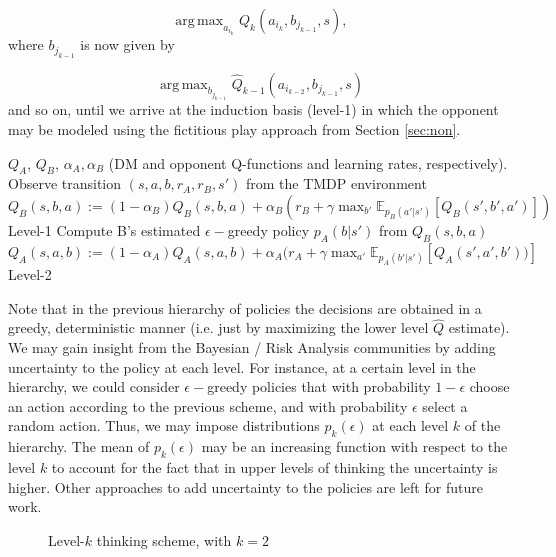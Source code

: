 \documentclass[letterpaper]{article} %
\DeclareMathOperator*{\argmax}{arg\,max}
\begin{document}
\[
\argmax_{a_{i_k}} Q_k(a_{i_k}, b_{j_{k-1}}, s),
\]
where $b_{j_{k-1}}$ is now given by

\[
\argmax_{b_{j_{k-1}}} \hat{Q}_{k-1}(a_{i_{k-2}}, b_{j_{k-1}}, s)
\]
and so on, until we arrive at the induction basis (level-1) in which the opponent may be modeled using the fictitious play approach from Section \ref{sec:non}.

\begin{algorithm*}[!ht]
\begin{algorithmic}
\Require $Q_A$, $Q_B$, $\alpha_A, \alpha_B$ (DM and opponent Q-functions and learning rates, respectively).
\State Observe  transition $(s, a, b, r_A, r_B, s')$ from the TMDP environment
\State $Q_B(s,b,a) := (1 - \alpha_B)Q_B(s,b,a)  + \alpha_B (r_B + \gamma \max_{b'} \mathbb{E}_{p_B(a'|s')} \left[ Q_B(s',b', a') \right] )$ \Comment Level-1
\State Compute B's estimated $\epsilon-$greedy policy $p_A(b|s')$ from $Q_B(s,b,a)$
\State $Q_A(s,a,b) := (1 - \alpha_A)Q_A(s,a,b) + \alpha_A (r_A + \gamma \max_{a'} \mathbb{E}_{p_A(b'|s')} \left[ Q_A(s',a',b')) \right] $ \Comment Level-2
\end{algorithmic}
\caption{Level-2 thinking update rule}
\label{alg:l2ur}
\end{algorithm*}

Note that in the previous hierarchy of policies the decisions are obtained in a greedy, deterministic manner (i.e. just by maximizing the lower level $\hat{Q}$ estimate). We may gain insight from the Bayesian / Risk Analysis communities by adding uncertainty to the policy at each level. For instance, at a certain level in the hierarchy, we could consider $\epsilon-$greedy policies that with probability $1-\epsilon$ choose an action according to the previous scheme, and with probability $\epsilon$ select a random action. Thus, we may impose distributions $p_k(\epsilon)$ at each level $k$ of the hierarchy. The mean of $p_k(\epsilon)$ may be an increasing function with respect to the level $k$ to account for the fact that in upper levels of thinking the uncertainty is higher. Other approaches to add uncertainty to the policies are left for future work.


\begin{figure}
\centering
{}
\caption{Level-$k$ thinking scheme, with $k=2$}\label{fig:lev2_scheme}
\end{figure}
\end{document}

